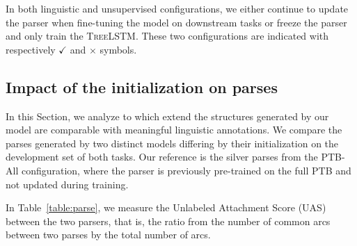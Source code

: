 In both linguistic and unsupervised configurations, we either continue to update the parser when fine-tuning the model on downstream tasks or freeze the parser and only train the \textsc{TreeLSTM}. These two configurations are indicated with respectively \textbf{$\checkmark$} and \textbf{$\times$} symbols. 
% 


\subsection{Impact of the initialization on parses}
\label{sec:parses-impact}



In this Section, we analyze to which extend the structures generated by our model are comparable with meaningful linguistic annotations. We compare the parses generated by two distinct models differing by their initialization on the development set of both tasks. Our reference is the silver parses from the PTB-All configuration, where the parser is previously pre-trained on the full PTB and not updated during training.   


In Table~\ref{table:parse}, we measure the Unlabeled Attachment Score (UAS) between the two parsers, that is, the ratio from the number of common arcs between two parses by the total number of arcs. 

